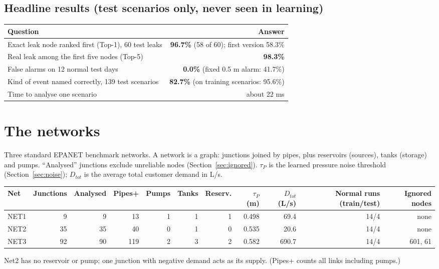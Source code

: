 \documentclass[11pt,a4paper]{article}
\begin{document}
\subsection{Headline results (test scenarios only, never seen in learning)}
\begin{center}\small\begin{tabular}{@{}lr@{}}\toprule
Question & Answer \\\midrule
Exact leak node ranked first (Top-1), 60 test leaks & \textbf{96.7\%} (58 of 60); first version 58.3\% \\
Real leak among the first five nodes (Top-5) & \textbf{98.3\%} \\
False alarms on 12 normal test days & \textbf{0.0\%} (fixed 0.5 m alarm: 41.7\%) \\
Kind of event named correctly, 139 test scenarios & \textbf{82.7\%} (on training scenarios: 95.6\%) \\
Time to analyse one scenario & about 22 ms \\\bottomrule\end{tabular}\end{center}

\section{The networks}
Three standard EPANET benchmark networks. A network is a graph: junctions joined by pipes, plus reservoirs (sources), tanks (storage) and pumps. ``Analysed'' junctions exclude unreliable nodes (Section~\ref{sec:ignored}). $\tau_P$ is the learned pressure noise threshold (Section~\ref{sec:noise}); $D_{tot}$ is the average total customer demand in L/s.
\begin{center}\small\begin{tabular}{@{}lrrrrrrrrrr@{}}\toprule
Net & Junctions & Analysed & Pipes+ & Pumps & Tanks & Reserv. & $\tau_P$ (m) & $D_{tot}$ (L/s) & Normal runs (train/test) & Ignored nodes \\\midrule
NET1 & 9 & 9 & 13 & 1 & 1 & 1 & 0.498 & 69.4 & 14/4 & none \\
NET2 & 35 & 35 & 40 & 0 & 1 & 0 & 0.535 & 20.6 & 14/4 & none \\
NET3 & 92 & 90 & 119 & 2 & 3 & 2 & 0.582 & 690.7 & 14/4 & 601, 61 \\
\bottomrule\end{tabular}\end{center}
Net2 has no reservoir or pump; one junction with negative demand acts as its supply. (Pipes+ counts all links including pumps.)
\end{document}
